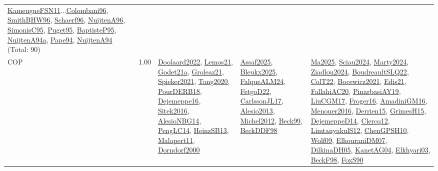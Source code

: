 {\begin{longtable}{p{3cm}r>{\raggedright\arraybackslash}p{6cm}>{\raggedright\arraybackslash}p{6cm}>{\raggedright\arraybackslash}p{8cm}}
\hyperref[detail:KameugneFSN11]{KameugneFSN11}...\hyperref[detail:Colombani96]{Colombani96}, \hyperref[detail:SmithBHW96]{SmithBHW96}, \hyperref[detail:Schaerf96]{Schaerf96}, \hyperref[detail:NuijtenA96]{NuijtenA96}, \hyperref[detail:SimonisC95]{SimonisC95}, \hyperref[detail:Puget95]{Puget95}, \hyperref[detail:BaptisteP95]{BaptisteP95}, \hyperref[detail:NuijtenA94a]{NuijtenA94a}, \hyperref[detail:Pape94]{Pape94}, \hyperref[detail:NuijtenA94]{NuijtenA94} (Total: 90)\\
\index{COP}\index{CP!COP}COP &  1.00 & \hyperref[detail:Doolaard2022]{Doolaard2022}, \hyperref[detail:Lemos21]{Lemos21}, \hyperref[detail:Godet21a]{Godet21a}, \hyperref[detail:Groleaz21]{Groleaz21}, \hyperref[detail:Spieker2021]{Spieker2021}, \hyperref[detail:Tang2020]{Tang2020}, \hyperref[detail:PourDERB18]{PourDERB18}, \hyperref[detail:Dejemeppe16]{Dejemeppe16}, \hyperref[detail:Sitek2016]{Sitek2016}, \hyperref[detail:AlesioNBG14]{AlesioNBG14}, \hyperref[detail:PengLC14]{PengLC14}, \hyperref[detail:HeinzSB13]{HeinzSB13}, \hyperref[detail:Malapert11]{Malapert11}, \hyperref[detail:Dorndorf2000]{Dorndorf2000} & \hyperref[detail:Assaf2025]{Assaf2025}, \hyperref[detail:Bleukx2025]{Bleukx2025}, \hyperref[detail:FalqueALM24]{FalqueALM24}, \hyperref[detail:FetgoD22]{FetgoD22}, \hyperref[detail:CarlssonJL17]{CarlssonJL17}, \hyperref[detail:Alesio2013]{Alesio2013}, \hyperref[detail:Michel2012]{Michel2012}, \hyperref[detail:Beck99]{Beck99}, \hyperref[detail:BeckDDF98]{BeckDDF98} & \hyperref[detail:Ma2025]{Ma2025}, \hyperref[detail:Sciau2024]{Sciau2024}, \hyperref[detail:Marty2024]{Marty2024}, \hyperref[detail:Ziadlou2024]{Ziadlou2024}, \hyperref[detail:BoudreaultSLQ22]{BoudreaultSLQ22}, \hyperref[detail:ColT22]{ColT22}, \hyperref[detail:Bocewicz2021]{Bocewicz2021}, \hyperref[detail:Edis21]{Edis21}, \hyperref[detail:FallahiAC20]{FallahiAC20}, \hyperref[detail:PinarbasiAY19]{PinarbasiAY19}, \hyperref[detail:LiuCGM17]{LiuCGM17}, \hyperref[detail:Froger16]{Froger16}, \hyperref[detail:AmadiniGM16]{AmadiniGM16}, \hyperref[detail:Menouer2016]{Menouer2016}, \hyperref[detail:Derrien15]{Derrien15}, \hyperref[detail:GrimesH15]{GrimesH15}, \hyperref[detail:DejemeppeD14]{DejemeppeD14}, \hyperref[detail:Clercq12]{Clercq12}, \hyperref[detail:LimtanyakulS12]{LimtanyakulS12}, \hyperref[detail:ChenGPSH10]{ChenGPSH10}, \hyperref[detail:Wolf09]{Wolf09}, \hyperref[detail:ElhouraniDM07]{ElhouraniDM07}, \hyperref[detail:DilkinaDH05]{DilkinaDH05}, \hyperref[detail:KanetAG04]{KanetAG04}, \hyperref[detail:Elkhyari03]{Elkhyari03}, \hyperref[detail:BeckF98]{BeckF98}, \hyperref[detail:FoxS90]{FoxS90}\\

\end{longtable}}
